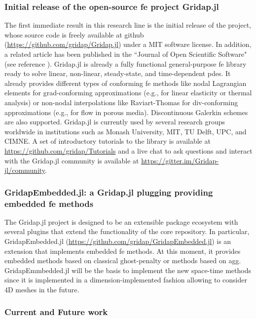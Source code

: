 \documentclass{article}
\begin{document}
\subsubsection{Initial release of the open-source \ac{fe} project Gridap.jl} 

The first immediate result in this research line is the initial release of the project, whose source code is freely available at github (\url{https://github.com/gridap/Gridap.jl}) under a MIT software license. In addition, a related article  {has been published in the ``Journal of Open Scientific Software"} (see reference \cite{Badia2020}). Gridap.jl is already a fully functional general-purpose \ac{fe} library ready to solve linear, non-linear, steady-state, and time-dependent \acp{pde}. It already provides different types of conforming \ac{fe} methods like nodal Lagrangian elements for grad-conforming approximations (e.g., for linear elasticity or thermal analysis) or non-nodal interpolations like Raviart-Thomas for div-conforming approximations (e.g., for flow in porous media). Discontinuous Galerkin schemes are also supported. Gridap.jl is currently used by several research groups worldwide in institutions such as Monash University, MIT, TU Delft, UPC, and CIMNE. A set of introductory tutorials to the library is available at \url{https://github.com/gridap/Tutorials} and a live chat to ask questions and interact with the Gridap.jl community is available at \url{https://gitter.im/Gridap-jl/community}.

\subsubsection{GridapEmbedded.jl: a Gridap.jl plugging providing embedded \ac{fe} methods}

The Gridap.jl project is designed to be an extensible package ecosystem with several plugins that extend the functionality of the core repository. In particular, GridapEmbedded.jl (\url{https://github.com/gridap/GridapEmbedded.jl}) is an extension that implements embedded \ac{fe} methods. At this moment, it provides embedded methods based on classical ghost-penalty  or methods based on \ac{agg}. GridapEmmbedded.jl will be the basis to implement the new space-time methods since it is implemented in a dimension-implemented fashion allowing to consider 4D meshes in the future. 

\subsubsection{Current and Future work}
 
\end{document}
